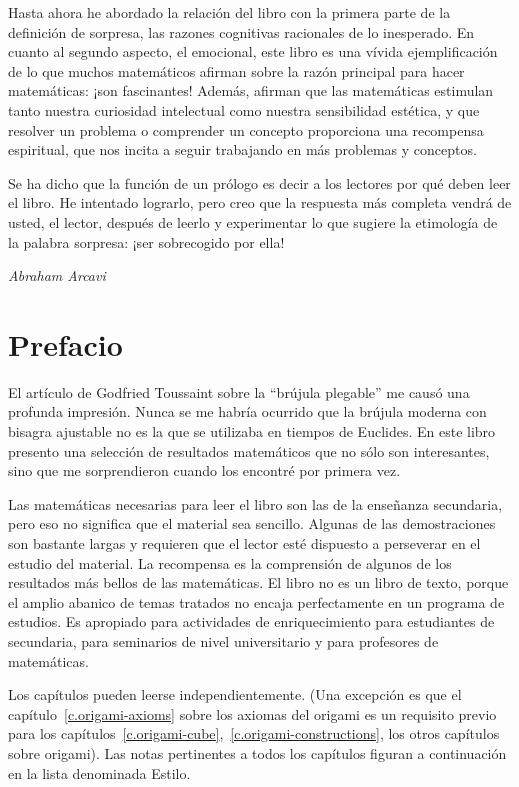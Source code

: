 Hasta ahora he abordado la relación del libro con la primera parte de la definición de sorpresa, las razones cognitivas racionales de lo inesperado. En cuanto al segundo aspecto, el emocional, este libro es una vívida ejemplificación de lo que muchos matemáticos afirman sobre la razón principal para hacer matemáticas: ¡son fascinantes! Además, afirman que las matemáticas estimulan tanto nuestra curiosidad intelectual como nuestra sensibilidad estética, y que resolver un problema o comprender un concepto proporciona una recompensa espiritual, que nos incita a seguir trabajando en más problemas y conceptos. 

Se ha dicho que la función de un prólogo es decir a los lectores por qué deben leer el libro. He intentado lograrlo, pero creo que la respuesta más completa vendrá de usted, el lector, después de leerlo y experimentar lo que sugiere la etimología de la palabra sorpresa: ¡ser sobrecogido por ella!

\bigskip

\begin{flushright}
\textit{Abraham Arcavi}
\end{flushright}

\chapter*{Prefacio}

El artículo de Godfried Toussaint sobre la ``brújula plegable'' \cite{toussaint} me causó una profunda impresión. Nunca se me habría ocurrido que la brújula moderna con bisagra ajustable no es la que se utilizaba en tiempos de Euclides. En este libro presento una selección de resultados matemáticos que no sólo son interesantes, sino que me sorprendieron cuando los encontré por primera vez.

Las matemáticas necesarias para leer el libro son las de la enseñanza secundaria, pero eso no significa que el material sea sencillo. Algunas de las demostraciones son bastante largas y requieren que el lector esté dispuesto a perseverar en el estudio del material. La recompensa es la comprensión de algunos de los resultados más bellos de las matemáticas. El libro no es un libro de texto, porque el amplio abanico de temas tratados no encaja perfectamente en un programa de estudios. Es apropiado para actividades de enriquecimiento para estudiantes de secundaria, para seminarios de nivel universitario y para profesores de matemáticas.

Los capítulos pueden leerse independientemente. (Una excepción es que el capítulo~\ref{c.origami-axioms} sobre los axiomas del origami es un requisito previo para los capítulos~\ref{c.origami-cube},~\ref{c.origami-constructions}, los otros capítulos sobre origami). Las notas pertinentes a todos los capítulos figuran a continuación en la lista denominada Estilo.

